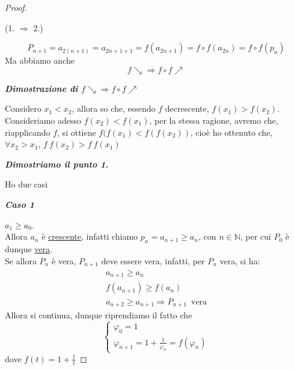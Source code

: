 \documentclass{article}
\theoremstyle{definition}
\begin{document}
\begin{proof}
    \begin{center}
        (1. $\Rightarrow$ 2.)
    \end{center}
\begin{equation}
    P_{n+1}=a_{2(n+1)}=a_{2n+1+1}=f(a_{2n+1})=f \circ f(a_{2n})=f \circ f(p_n)
\end{equation}
    Ma abbiamo anche
    \begin{equation}
        f \searrow \Rightarrow f \circ f \nearrow
    \end{equation}
    \begin{center}
        \textbf{\textit{Dimostrazione di $ f \searrow \Rightarrow f \circ f \nearrow$}}
    \end{center}
    Considero $x_1 < x_2$, allora so che, essendo $f$ decrescente, $f(x_1) > f(x_2)$.
    \\
    Consideriamo adesso $f(x_2) < f(x_1)$, per la stessa ragione, avremo che, riapplicando $f$, si ottiene $f(f(x_1) < f(f(x_2))$, cioè ho ottenuto che, $\forall x_2 > x_1$, $f \ f (x_2) > f \ f (x_1)$
    \begin{center}
        \textbf{\textit{Dimostriamo il punto 1.}}
    \end{center}
    Ho due casi
    \begin{center}
        \textbf{\textit{Caso 1}}
    \end{center}
    $a_1 \geqslant a_0$.
    \\
    Allora $a_n$ è \underline{crescente}, infatti chiamo $p_n=a_{n+1} \geqslant a_n$, con $n \in \mathbb{N}$, per cui $P_0$ è dunque \underline{vera}.
    \\
    Se allora $P_n$ è vera, $P_{n+1}$ deve essere vera, infatti, per $P_n$ vera, si ha:
    \begin{align*}
        a_{n+1} \geqslant a_n \\
        f(a_{n+1}) \geqslant f(a_n) \\
        a_{n+2} \geqslant a_{n+1} \Rightarrow P_{n+1} \,\,\,\mbox{vera}
    \end{align*}
    Allora si continua, dunque riprendiamo il fatto che
    \begin{equation}
        \begin{cases}
            \varphi_0=1 \\
            \varphi_{n+1}=1+\frac{1}{\varphi_n}=f(\varphi_n)
        \end{cases}
    \end{equation}
    dove $f(t)=1+\frac{1}{t}$

\end{proof}
\end{document}
